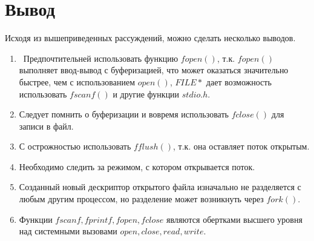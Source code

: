 \section{Вывод}

Исходя из вышеприведенных рассуждений, можно сделать несколько выводов.

\begin{enumerate}
	\item  Предпочтительней использовать функцию $fopen()$, т.к. $fopen()$ выполняет ввод-вывод с буферизацией, что может оказаться значительно быстрее, чем  с использованием $open()$, $FILE *$ дает возможность использовать $fscanf()$ и другие функции $stdio.h$.
	\item Следует помнить о буферизации и вовремя использовать $fclose()$ для записи в файл.
	\item С острожностью использовать $fflush()$, т.к. она оставляет поток открытым.
	\item Необходимо следить за режимом, с котором открывается поток. 
	\item Созданный новый дескриптор открытого файла  изначально не разделяется с любым другим процессом, но разделение может возникнуть через $fork()$.
	\item Функции $fscanf, fprintf, fopen, fclose$ являются обертками высшего уровня над системными вызовами $open, close, read, write$.
\end{enumerate}